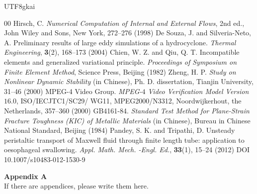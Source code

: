 \documentclass[a4paper, 11pt, twoside]{article}
\begin{document}
\begin{CJK*}{UTF8}{gkai}
\begin{thebibliography}{00}   %
\footnotesize
Hirsch, C. \emph{Numerical Computation of Internal and
External Flows}, 2nd ed., John Wiley and Sons, New York, 272--276
(1998)
De Souza, J. and Silveria-Neto, A. Preliminary results of large eddy
simulations of a hydrocyclone. \textit{Thermal Engineering},
\textbf{3}(2), 168--173 (2004)
 Chien, W. Z. and Qiu, Q. T. Incompatible elements and
generalized variational principle. \emph{Proceedings of Symposium on
Finite Element Method}, Science Press, Beijing (1982)
 Zheng, H. P. \emph{Study on Nonlinear Dynamic
Stability} (in Chinese), Ph. D. dissertation, Tianjin University,
31--46 (2000)
MPEG-4 Video Group. \textit{MPEG-$4$ Video
Verification Model Version $16.0$}, ISO/IECJTC1/SC29/ WG11,
MPEG2000/N3312, Noordwijkerhout, the Netherlands, 357--360 (2000)
GB4161-84. \textit{Standard Test Method
for Plane-Strain Fracture Toughness {\rm (}KIC{\rm )} of Metallic
Materials} (in Chinese), Bureau in Chinese National Standard,
Beijing (1984)
 Pandey, S. K. and Tripathi, D. Unsteady peristaltic transport of Maxwell fluid through finite length
tube: application to oesophageal swallowing. \emph{Appl. Math. Mech.
-Engl. Ed.}, \textbf{33}(1), 15--24 (2012) DOI
10.1007/s10483-012-1530-9
\end{thebibliography}
\renewcommand{\theequation}{A\arabic{equation}}
\setcounter{equation}{0}

\footnotesize \noindent\textbf{Appendix A}
\\

If there are appendices, please write them here.


\end{CJK*}
\end{document}
